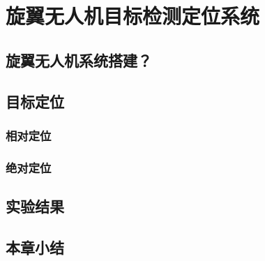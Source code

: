 
\chapter{旋翼无人机目标检测定位系统}

\section{旋翼无人机系统搭建？}

\section{目标定位}

\subsection{相对定位}

\subsection{绝对定位}

\section{实验结果}

\section{本章小结}

